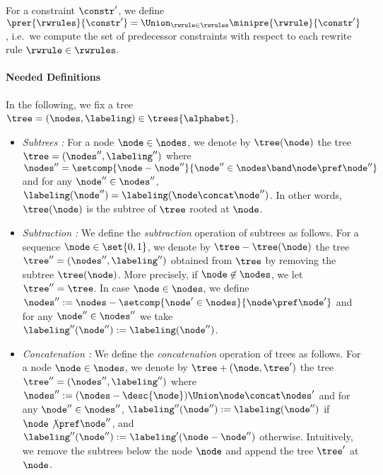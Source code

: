 %
For a constraint $\constr'$, we define $\prer{\rwrules}{\constr'}=\Union_{\rwrule\in\rwrules}
\minipre{\rwrule}{\constr'}$, i.e.\ we compute the set of predecessor constraints with 
respect to each rewrite rule $\rwrule\in\rwrules$. 
% 

%
\paragraph{\bf Needed Definitions}
%
In the following, we fix a tree $\tree=(\nodes,\labeling)\in\trees{\alphabet}$.
%
\begin{itemize}
%
\item {\it Subtrees : } For a node $\node\in\nodes$, we denote by $\tree(\node)$ the tree 
$\tree=(\nodes'',\labeling'')$ where $\nodes''=\setcomp{\node-\node''}{\node''\in\nodes
\band\node\pref\node''}$ and for any $\node''\in\nodes''$, $\labeling(\node'')=\labeling(
\node\concat\node'')$.
%
In other words, $\tree(\node)$ is the subtree of $\tree$ rooted at $\node$.
%

\item {\it Subtraction : } We define the \emph{subtraction} operation of subtrees 
as follows.
%
For a sequence $\node\in\set{0,1}$, we denote by $\tree-\tree(\node)$ the tree $\tree''=(
\nodes'',\labeling'')$ obtained from $\tree$ by removing the subtree $\tree(\node)$.
%
More precisely, if $\node\not\in\nodes$, we let $\tree''=\tree$.
%
In case $\node\in\nodes$, we define $\nodes'':=\nodes-\setcomp{\node'\in\nodes}{\node
\pref\node'}$ and for any $\node''\in\nodes''$ we take $\labeling''(\node''):=\labeling(
\node'')$.
%
%


\item {\it Concatenation : } We define the \emph{concatenation} operation of trees 
as follows.
%
For a node $\node\in\nodes$, we denote by $\tree+(\node,\tree')$ the tree $\tree''=(\nodes'',
\labeling'')$ where $\nodes'':=(\nodes-\desc{\node})\Union\node\concat\nodes'$ and for any 
$\node''\in\nodes''$, $\labeling''(\node''):=\labeling(\node'')$ if $\node\not\pref\node''$, and 
$\labeling''(\node''):=\labeling'(\node-\node'')$ otherwise.
%
Intuitively, we remove the subtrees below the node $\node$ and append the tree $\tree'$ 
at $\node$.
%


\end{itemize}
